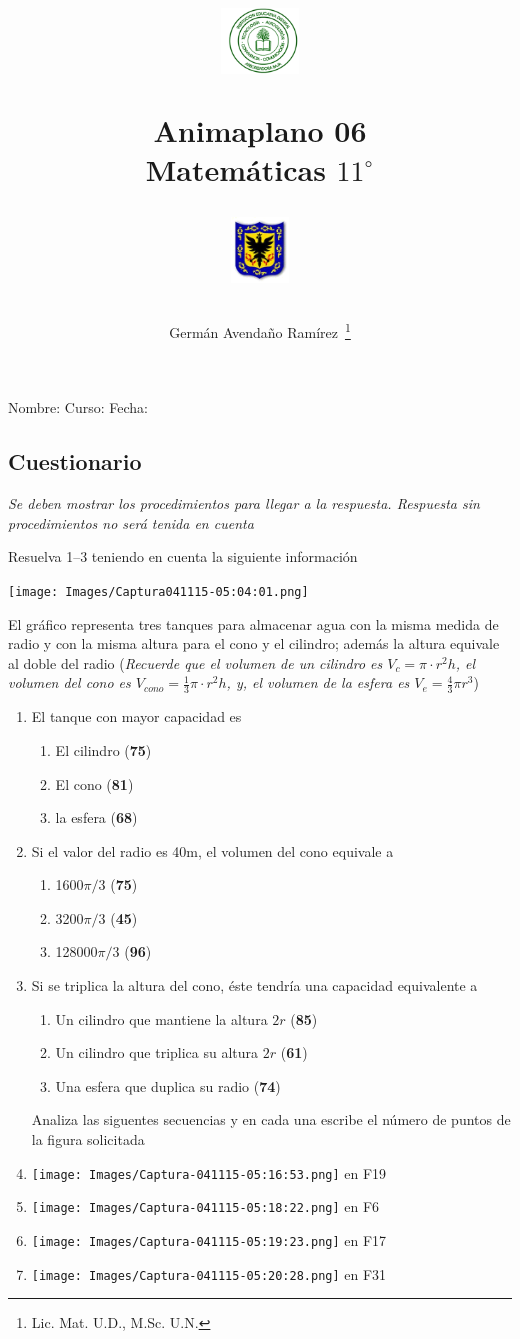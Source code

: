 \documentclass[letterpaper,twoside]{article}
\author{Germ\'an Avenda\~no Ram\'irez~\thanks{Lic. Mat. U.D., M.Sc. U.N.}}
\title{\begin{minipage}{.2\textwidth}
\includegraphics[height=1.75cm]{Images/logo-colegio.png}\end{minipage}
\begin{minipage}{.55\textwidth}
\begin{center}
Animaplano 06\\
Matemáticas $11^{\circ}$
\end{center}
\end{minipage}\hfill
\begin{minipage}{.2\textwidth}
\includegraphics[height=1.75cm]{Images/logo-sed.png} 
\end{minipage}}
\date{}
\begin{document}
\maketitle
Nombre: \hrulefill Curso: \underline{\hspace*{44pt}} Fecha: \underline{\hspace*{2.5cm}}
\begin{multicols}{2}
\section*{Cuestionario}
\emph{Se deben mostrar los procedimientos para llegar a la respuesta. Respuesta sin procedimientos no será tenida en cuenta}

Resuelva 1--3 teniendo en cuenta la siguiente información
\begin{center}
\texttt{[image: Images/Captura041115-05:04:01.png]} 
\end{center}
El gráfico representa tres tanques para almacenar agua con la misma medida de radio y con la misma altura para el cono y el cilindro; además la altura equivale al doble del radio (\emph{Recuerde que el volumen de un cilindro es $V_{c}=\pi\cdot r^{2}h$, el volumen del cono es $V_{cono}=\frac{1}{3}\pi\cdot r^{2}h$, y, el volumen de la esfera es $V_{e}=\frac{4}{3}\pi r^{3}$})
\begin{enumerate}
\item El tanque con mayor capacidad es
\begin{enumerate}
\item El cilindro (\textbf{75})
\item El cono (\textbf{81})
\item la esfera (\textbf{68})
\end{enumerate}
\item Si el valor del radio es 40m, el volumen del cono equivale a
\begin{enumerate}
\item 1600$\pi/3$ (\textbf{75})
\item 3200$\pi/3$ (\textbf{45})
\item 128000$\pi/3$ (\textbf{96})
\end{enumerate}
\item Si se triplica la altura del cono, éste tendría una capacidad equivalente a
\begin{enumerate}
\item Un cilindro que mantiene la altura $2r$ (\textbf{85})
\item Un cilindro que triplica su altura $2r$ (\textbf{61})
\item Una esfera que duplica su radio (\textbf{74})
\end{enumerate}
Analiza las siguentes secuencias y en cada una escribe el número de puntos de la figura solicitada
\item \texttt{[image: Images/Captura-041115-05:16:53.png]} en F19
\item \texttt{[image: Images/Captura-041115-05:18:22.png]} en F6
\item \texttt{[image: Images/Captura-041115-05:19:23.png]} en F17
\item \texttt{[image: Images/Captura-041115-05:20:28.png]} en F31


\end{enumerate}
\end{multicols}
\end{document}
